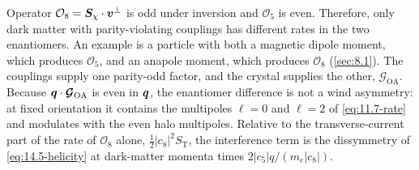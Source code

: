 \noindent Operator $\mathcal{O}_8 = \bm{S}_\chi\cdot\bm{v}^\perp$ is odd under inversion and $\mathcal{O}_5$ is even. Therefore, only dark matter with parity-violating couplings has different rates in the two enantiomers. An example is a particle with both a magnetic dipole moment, which produces $\mathcal{O}_5$, and an anapole moment, which produces $\mathcal{O}_8$ (\cref{sec:8.1}). The couplings supply one parity-odd factor, and the crystal supplies the other, $\boldsymbol{\mathcal{G}}_{\mathrm{OA}}$. Because $\bm{q}\cdot\boldsymbol{\mathcal{G}}_{\mathrm{OA}}$ is even in $\bm{q}$, the enantiomer difference is not a wind asymmetry: at fixed orientation it contains the multipoles $\ell = 0$ and $\ell = 2$ of \cref{eq:11.7-rate} and modulates with the even halo multipoles. Relative to the transverse-current part of the rate of $\mathcal{O}_8$ alone, $\frac12|c_8|^2S_{\mathrm{T}}$, the interference term is the dissymmetry of \cref{eq:14.5-helicity} at dark-matter momenta times $2|c_5|q/(m_e|c_8|)$.

